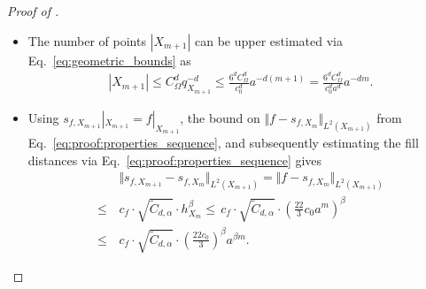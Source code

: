 \documentclass[a4paper, 10pt]{article}
\begin{document}
\begin{proof}[Proof of ]
\begin{itemize}
\begin{align*}
=& ~ \frac{6^{2\tau-d}}{c_0^{2\tau - d + 1} a^{2\tau-d}} a^{-m (2\tau - d)}.
%
\end{align*}
\item The number of points $|X_{m+1}|$ can be upper estimated via Eq.\ \eqref{eq:geometric_bounds} as 
\begin{align*}
|X_{m+1}| \leq C_\Omega^d q_{X_{m+1}}^{-d} \leq \frac{6^d C_\Omega^d}{c_0^d} a^{-d(m+1)} = \frac{6^d C_\Omega^d}{c_0^d a^d} a^{-dm}.
\end{align*}
\item Using $s_{f, X_{m+1}}|_{X_{m+1}} = f|_{X_{m+1}}$, 
the bound on $\Vert f - s_{f, X_m} \Vert_{L^2(X_{m+1})}$ from Eq.\ \eqref{eq:proof:properties_sequence}, and subsequently estimating the fill distances via Eq.\ \eqref{eq:proof:properties_sequence} gives
\begin{align*}
&\Vert s_{f, X_{m+1}} - s_{f, X_{m}} \Vert_{L^2(X_{m+1})} = \Vert f - s_{f, X_{m}} \Vert_{L^2(X_{m+1})} \\
%
\leq \, &c_f \cdot \sqrt{\tilde{C}_{d, \alpha}} \cdot h_{X_m}^\beta \leq \, c_f \cdot \sqrt{\tilde{C}_{d, \alpha}} \cdot \left( \frac{22}{3} c_0 a^m \right)^\beta \\
\leq \, &c_f \cdot \sqrt{\tilde{C}_{d, \alpha}} \cdot \left( \frac{22c_0}{3} \right)^\beta a^{\beta m}.
\end{align*}
\end{itemize}


\end{proof}
\end{document}
